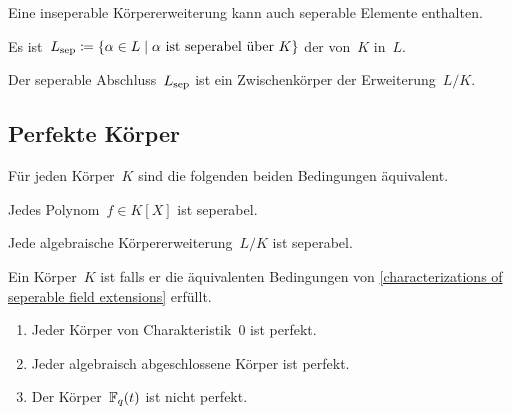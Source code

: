\begin{warning}
  Eine inseperable Körpererweiterung kann auch seperable Elemente enthalten.
\end{warning}

\begin{definition}
  Es ist~$L_{\sep} \defined \{ \alpha \in L \suchthat \text{$\alpha$ ist seperabel über~$K$} \}$ der  von~$K$ in~$L$.
\end{definition}

\begin{proposition}
  Der seperable Abschluss~$L_{\mathrm{sep}}$ ist ein Zwischenkörper der Erweiterung~$L/K$.
\end{proposition}



\subsection{Perfekte Körper}

\begin{proposition}
  \label{characterizations of seperable field extensions}
  Für jeden Körper~$K$ sind die folgenden beiden Bedingungen äquivalent.
  \begin{equivlist}
    \item
      Jedes Polynom~$f \in K[X]$ ist seperabel.
    \item
      Jede algebraische Körpererweiterung~$L/K$ ist seperabel.
  \end{equivlist}
\end{proposition}

\begin{definition}
  Ein Körper~$K$ ist  falls er die äquivalenten Bedingungen von \cref{characterizations of seperable field extensions} erfüllt. 
\end{definition}

\begin{example}
  \leavevmode
  \begin{enumerate}
    \item
      Jeder Körper von Charakteristik~$0$ ist perfekt.
    \item
      Jeder algebraisch abgeschlossene Körper ist perfekt.
    \item
      Der Körper~$\mathbb{F}_q(t)$ ist nicht perfekt.
  \end{enumerate}
\end{example}



